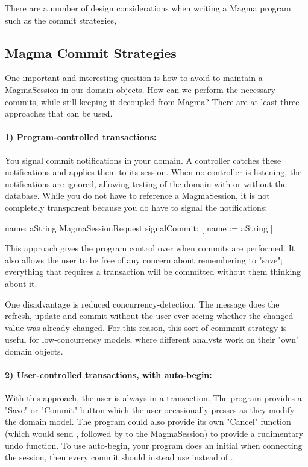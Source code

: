 \documentclass[a4paper,10pt,twoside]{book}
\begin{document}
There are a number of design considerations when writing a Magma program such as the commit strategies, 

\subsection{Magma Commit Strategies}
One important and interesting question is how to avoid to maintain a MagmaSession in our domain objects. How can we perform the necessary commits, while still keeping it decoupled from Magma? There are at least three approaches that can be used.



\paragraph{1) Program-controlled transactions:} You signal commit notifications in your domain. A controller catches these notifications and applies them to its session. When no controller is listening, the notifications are ignored, allowing testing of the domain with or without the database. While you do not have to reference a MagmaSession, it is not completely transparent because you do have to signal the notifications:

\begin{code}{}
	name: aString
		MagmaSessionRequest signalCommit: [ name := aString ]
\end{code}

This approach gives the program control over when commits are performed. It also allows the user to be free of any concern about remembering to "save"; everything that requires a transaction will be committed without them thinking about it.

One disadvantage is reduced concurrency-detection. The message  does the refresh, update and commit without the user ever seeing whether the changed value was already changed. For this reason, this sort of commmit strategy is useful for low-concurrency models, \ie where different analysts work on their "own" domain objects.


\paragraph{2) User-controlled transactions, with auto-begin:} With this approach, the user is always in a transaction. The program provides a "Save" or "Commit" button which the user occasionally presses as they modify the domain model. The program could also provide its own "Cancel" function (which would send , followed by  to the MagmaSession) to provide a rudimentary undo function. To use auto-begin, your program does an initial  when connecting the session, then every commit should instead use  instead of .
\end{document}
